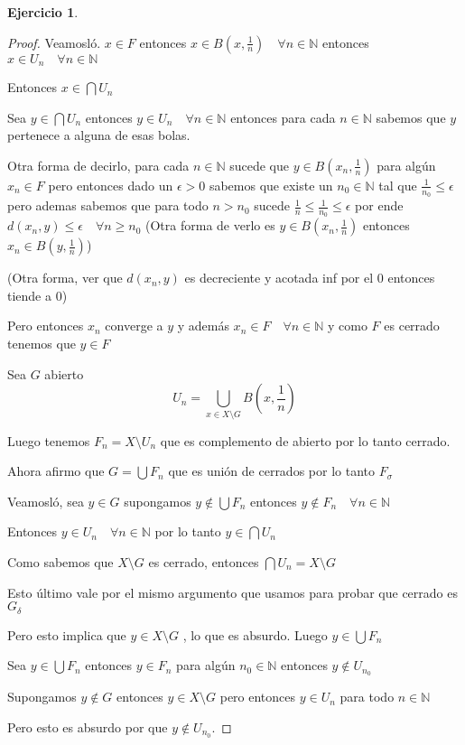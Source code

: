 \documentclass[11pt]{report}
\newcommand{\N}{\mathbb{N}}
\theoremstyle{definition}
\newtheorem{ej}{Ejercicio}
\begin{document}
\begin{ej}
\begin{enumerate}
\begin{proof}
  Veamosló. $x \in F$ entonces $x \in B(x,\frac{1}{n})\quad \forall n \in \N$ entonces $x \in U_n \quad \forall n \in \N$

Entonces $x \in \bigcap U_n$

Sea $y \in \bigcap U_n$ entonces $y \in U_n \quad \forall n \in \N$ entonces para cada $n \in \N$ sabemos que $y $ pertenece a alguna de esas bolas.

Otra forma de decirlo, para cada $n\in \N$ sucede que $y \in B(x_n,\frac{1}{n})$ para algún $x_n \in F$ pero entonces dado un $\epsilon > 0$ sabemos que existe un $n_0 \in \N$ tal que $\frac{1}{n_0} \leq \epsilon$ pero ademas sabemos que para todo $n > n_0 $ sucede $\frac{1}{n} \leq \frac{1}{n_0} \leq \epsilon $ por ende $d(x_n , y) \leq \epsilon \quad \forall n \geq n_0$ (Otra forma de verlo es $y \in B(x_n,\frac{1}{n})$ entonces $x_n \in B(y,\frac{1}{n})$)

(Otra forma, ver que $d(x_n,y)$ es decreciente y acotada inf por el 0 entonces tiende a 0)

Pero entonces $x_n$ converge a $y$ y además $x_n \in F \quad \forall n \in \N$ y como $F$ es cerrado tenemos que $y \in F$

Sea $G$ abierto
$$U_n = \bigcup_{x \in X \setminus G}B(x,\frac{1}{n}) $$

Luego tenemos $F_n = X \setminus U_n$ que es complemento de abierto por lo tanto cerrado.

Ahora afirmo que $G = \bigcup F_n$ que es unión de cerrados por lo tanto $F_{\sigma}$

Veamosló, sea $y \in G$ supongamos $y \notin \bigcup F_n $ entonces $y \notin F_n \quad \forall n \in \N$

Entonces $y \in U_n \quad \forall n \in \N$ por lo tanto $y \in \bigcap U_n$ 

Como sabemos que $X \setminus G$ es cerrado, entonces $\bigcap U_n = X\setminus G$ 

Esto último vale por el mismo argumento que usamos para probar que cerrado es $G_{\delta}$ 

Pero esto implica que $y \in X \setminus G $ , lo que es absurdo. Luego $y \in \bigcup F_n$

Sea $y \in \bigcup F_n$ entonces $y \in F_n$ para algún $ n_0 \in \N$ entonces $y \notin U_{n_0}$ 

Supongamos $y \notin G$ entonces $y \in X \setminus G$ pero entonces $y \in U_n$ para todo $n \in \N$ 

Pero esto es absurdo por que $y \notin U_{n_0}$. 


\end{proof}
\end{enumerate}
\end{ej}
\end{document}
